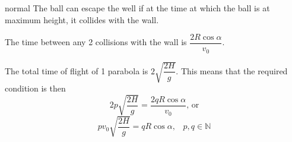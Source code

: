 \begin{solution}{normal}
The ball can escape the well if at the time at which the ball is at maximum height, it collides with the wall.\vspace{3mm}

The time between any 2 collisions with the wall is $\dfrac{2R\cos\alpha}{v_0}$.\vspace{3mm}

The total time of flight of 1 parabola is $2\sqrt{\dfrac{2H}{g}}$. This means that the required condition is then 
$$2p\sqrt{\frac{2H}{g}} = \dfrac{2qR\cos\alpha}{v_0}\text{, or}$$
$$\boxed{pv_0\sqrt{\frac{2H}{g}} = qR\cos\alpha,\;\;\;p,q\in\mathbb{N}}$$
\end{solution}